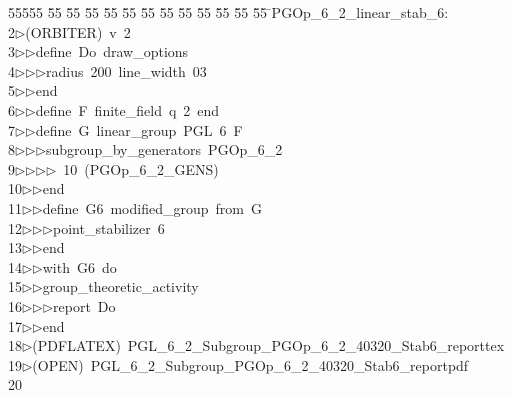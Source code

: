 %
%
\begin{tabbing}
55555 \= 55 \= 55 \= 55 \= 55 \= 55 \= 55 \= 55 \= 55 \= 55 \= 55 \= 55 \= 55 \= \>PGOp\_6\_2\_linear\_stab\_6:\\[0pt]
2\>$\triangleright$\>(ORBITER)\ v\ 2\ \\[0pt]
3\>$\triangleright$\>$\triangleright$\>define\ Do\ draw\_options\ \\[0pt]
4\>$\triangleright$\>$\triangleright$\>$\triangleright$\>radius\ 200\ line\_width\ 03\ \\[0pt]
5\>$\triangleright$\>$\triangleright$\>end\ \\[0pt]
6\>$\triangleright$\>$\triangleright$\>define\ F\ finite\_field\ q\ 2\ end\ \\[0pt]
7\>$\triangleright$\>$\triangleright$\>define\ G\ linear\_group\ PGL\ 6\ F\ \\[0pt]
8\>$\triangleright$\>$\triangleright$\>$\triangleright$\>subgroup\_by\_generators\ PGOp\_6\_2\ \\[0pt]
9\>$\triangleright$\>$\triangleright$\>$\triangleright$\>$\triangleright$\ 10\ (PGOp\_6\_2\_GENS)\ \\[0pt]
10\>$\triangleright$\>$\triangleright$\>end\ \\[0pt]
11\>$\triangleright$\>$\triangleright$\>define\ G6\ modified\_group\ from\ G\ \\[0pt]
12\>$\triangleright$\>$\triangleright$\>$\triangleright$\>point\_stabilizer\ 6\ \\[0pt]
13\>$\triangleright$\>$\triangleright$\>end\ \\[0pt]
14\>$\triangleright$\>$\triangleright$\>with\ G6\ do\ \\[0pt]
15\>$\triangleright$\>$\triangleright$\>group\_theoretic\_activity\ \\[0pt]
16\>$\triangleright$\>$\triangleright$\>$\triangleright$\>report\ Do\ \\[0pt]
17\>$\triangleright$\>$\triangleright$\>end\\[0pt]
18\>$\triangleright$\>(PDFLATEX)\ PGL\_6\_2\_Subgroup\_PGOp\_6\_2\_40320\_Stab6\_reporttex\\[0pt]
19\>$\triangleright$\>(OPEN)\ PGL\_6\_2\_Subgroup\_PGOp\_6\_2\_40320\_Stab6\_reportpdf\\[0pt]
20\>\end{tabbing}
